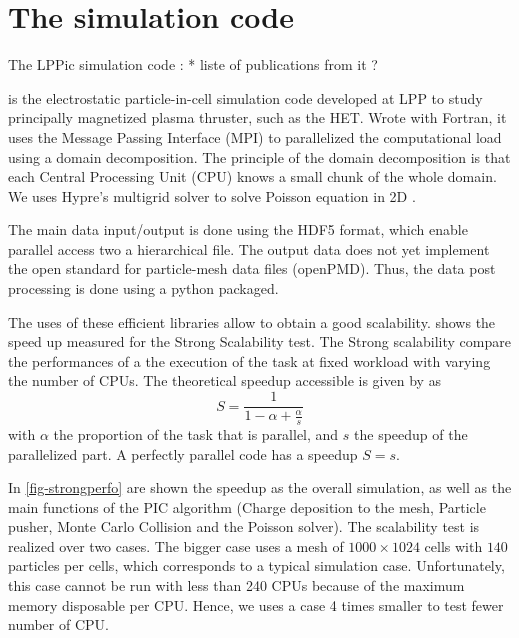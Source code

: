 

\section*{The \LPPic simulation code }
\label{sec-lppic}


The LPPic simulation code :
* liste of publications from it ? 

\LPPic is the electrostatic particle-in-cell simulation code developed at \ac{LPP} to study principally magnetized plasma thruster, such as the \ac{HET}.
Wrote with Fortran, it uses the Message Passing Interface (MPI) to parallelized the computational load using a domain decomposition.
The principle of the domain decomposition is that each Central Processing Unit (CPU) knows a small chunk of the whole domain.
We uses {\sc Hypre}'s multigrid solver to solve Poisson equation in \ac{2D} \citep{falgout2002}.

The main data input/output is done using the HDF5 format, which enable parallel access two a hierarchical file.
The output data does not yet implement the open standard for particle-mesh data files (openPMD).
Thus, the data post processing is done using a python packaged.

The uses of these efficient libraries allow to obtain a good scalability.
 shows the speed up measured for the Strong Scalability test.
The Strong scalability compare the performances of a the execution of the task at fixed workload with varying the number of CPUs.
The theoretical speedup accessible is given by \citet{amdahl1967} as
\begin{equation} \label{eq-amdahl}
  S = \frac{1}{1 - \alpha + \frac{\alpha}{s}}
\end{equation}
with $\alpha$ the proportion of the task that is parallel, and $s$ the speedup of the parallelized part.
A perfectly parallel code has a speedup $S=s$.

In \cref{fig-strongperfo} are shown the speedup as the overall simulation, as well as the main functions of the \ac{PIC} algorithm (Charge deposition to the mesh, Particle pusher, Monte Carlo Collision and the Poisson solver).
The scalability test is realized over two cases. 
The bigger case uses a mesh of $1000\times1024$ cells with $140$ particles per cells, which corresponds to a typical simulation case.
Unfortunately, this case cannot be run with less than 240 CPUs because of the maximum memory disposable per CPU. 
Hence, we uses a case 4 times smaller to test fewer number of CPU.

